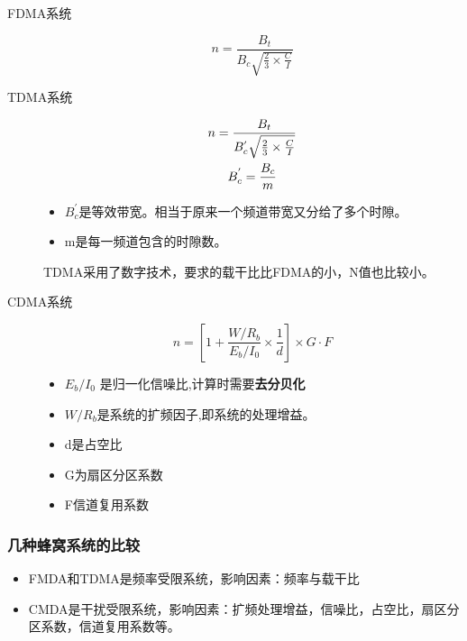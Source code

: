 	\begin{description}
		\item[FDMA系统] 		

		
		\begin{equation}
		n = \frac{B_t}{B_c\sqrt{\frac{2}{3}\times \frac{C}{I}}}
		\end{equation}
		\item [TDMA系统]
		\begin{gather}
			n = \frac{B_t}{B_c^{'}\sqrt{\frac{2}{3}\times \frac{C}{I}}} \notag \\
			B_c^{'} = \frac{B_c}{m}
		\end{gather}
		\begin{itemize}
			\item 	$B_c^{'}$是等效带宽。相当于原来一个频道带宽又分给了多个时隙。
			\item  		m是每一频道包含的时隙数。
		\end{itemize}
		TDMA采用了数字技术，要求的载干比比FDMA的小，N值也比较小。
		\item[CDMA系统] 
		\begin{equation}
		n = [1+\frac{W/R_b}{E_b/I_0}\times \frac{1}{d}]\times G\cdot F
		\end{equation}
		\begin{itemize}
			\item  $E_b/I_0$
			是归一化信噪比,计算时需要\textbf{去分贝化}
			\item $W/R_b$是系统的扩频因子,即系统的处理增益。
			\item d是占空比
			\item G为扇区分区系数
			\item F信道复用系数
		\end{itemize}
	\end{description}
	\subsubsection{几种蜂窝系统的比较}
	\begin{itemize}
		\item FMDA和TDMA是频率受限系统，影响因素：频率与载干比
		\item CMDA是干扰受限系统，影响因素：扩频处理增益，信噪比，占空比，扇区分区系数，信道复用系数等。
	\end{itemize}
